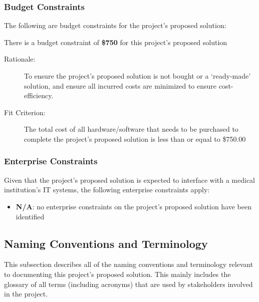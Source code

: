 \documentclass[12pt]{article}
\begin{document}
\subsubsection{Budget Constraints}
The following are budget constraints for the project's proposed solution:
\begin{enumerate}[label=MC\arabic*., resume*=mc]
    \begin{item}
        There is a budget constraint of \textbf{\$750} for this project's proposed solution
        \begin{description}
            \item[Rationale:] To ensure the project's proposed solution is not bought or a `ready-made' solution, and ensure all incurred costs are minimized to ensure cost-efficiency.
            \item[Fit Criterion:] The total cost of all hardware/software that needs to be purchased to complete the project's proposed solution is less than or equal to \$750.00
        \end{description}
    \end{item}
\end{enumerate}

\subsubsection{Enterprise Constraints}
Given that the project’s proposed solution is expected to interface with a medical institution’s IT systems, the following enterprise constraints apply:
\begin{itemize}
    \item \textbf{N/A}: no enterprise constraints on the project's proposed solution have been identified
\end{itemize}

\subsection{Naming Conventions and Terminology}
This subsection describes all of the naming conventions and terminology relevant to documenting this project's proposed solution. This mainly includes the glossary of all terms (including acronyms) that are used by stakeholders involved in the project.
\end{document}
